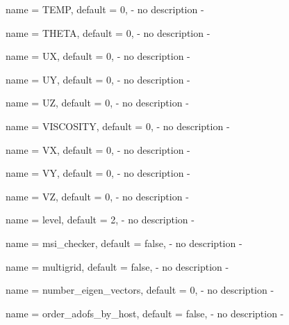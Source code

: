 \begin{parameter}{
    name    = {TEMP},
    default = {0},
}
- no description -
\end{parameter}

\begin{parameter}{
    name    = {THETA},
    default = {0},
}
- no description -
\end{parameter}

\begin{parameter}{
    name    = {UX},
    default = {0},
}
- no description -
\end{parameter}

\begin{parameter}{
    name    = {UY},
    default = {0},
}
- no description -
\end{parameter}

\begin{parameter}{
    name    = {UZ},
    default = {0},
}
- no description -
\end{parameter}

\begin{parameter}{
    name    = {VISCOSITY},
    default = {0},
}
- no description -
\end{parameter}

\begin{parameter}{
    name    = {VX},
    default = {0},
}
- no description -
\end{parameter}

\begin{parameter}{
    name    = {VY},
    default = {0},
}
- no description -
\end{parameter}

\begin{parameter}{
    name    = {VZ},
    default = {0},
}
- no description -
\end{parameter}

\begin{parameter}{
    name    = {level},
    default = {2},
}
- no description -
\end{parameter}

\begin{parameter}{
    name    = {msi_checker},
    default = {false},
}
- no description -
\end{parameter}

\begin{parameter}{
    name    = {multigrid},
    default = {false},
}
- no description -
\end{parameter}

\begin{parameter}{
    name    = {number_eigen_vectors},
    default = {0},
}
- no description -
\end{parameter}

\begin{parameter}{
    name    = {order_adofs_by_host},
    default = {false},
}
- no description -
\end{parameter}

